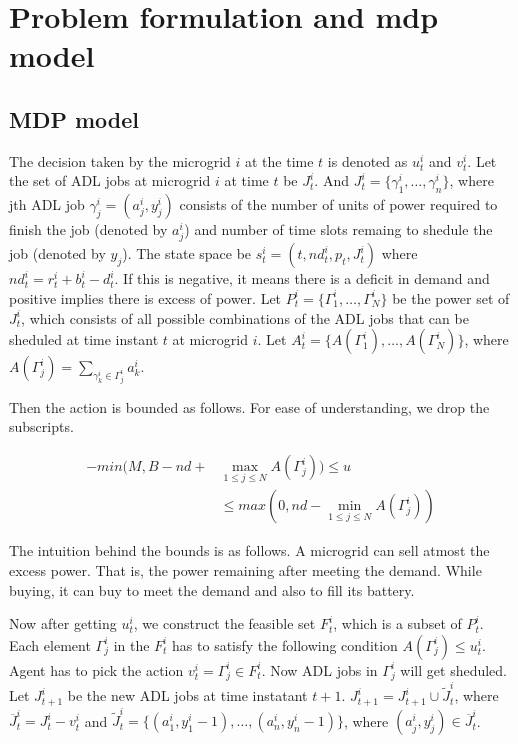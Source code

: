 \section{Problem formulation and mdp model}



\subsection{MDP model}

The decision taken by the microgrid $i$ at the time $t$ is denoted as $u_{t}^{i}$ and $v_{t}^{i}$.
Let the set of ADL jobs at microgrid $i$ at time $t$ be $J_{t}^{i}$. And  $J_{t}^{i}= \{\gamma_{1}^{i},\ldots,\gamma_{n}^{i}\}$, where jth ADL job $\gamma_{j}^{i} = (a_{j}^{i}, y_{j}^{i})$ consists of the number of units of power required to finish the job (denoted by  $a_{j}^{i}$) and number of time slots remaing to shedule the  job (denoted by  $y_{j}$).
The state space be $s_{t}^{i} = (t,nd_{t}^{i},p_{t}, J_{t}^{i})$ where $nd_{t}^{i} = r_{t}^{i} + b_{t}^{i} - d_{t}^{i}$. If this is negative, it means there is a deficit in demand and positive implies there is excess of power.
Let $P_{t}^{i} = \{\Gamma_{1}^{i},\ldots,\Gamma_{N}^{i}\}$ be the power set of $J_{t}^{i}$, which consists of all possible combinations of the ADL jobs that can be sheduled at time instant $t$ at microgrid $i$. 
Let  $A_{t}^{i} = \{A(\Gamma_{1}^{i}),\ldots,A(\Gamma_{N}^{i})\} $, where $A(\Gamma_{j}^{i}) = \sum_{\gamma_{k}^{i} \in \Gamma_{j}^{i} } a_{k}^{i}$.


Then the action is bounded as follows. For ease of understanding, we drop the subscripts.  

\begin{align}
-min(M, B - nd + &\max_{1\leq j \leq N} A(\Gamma_{j}^{i}) ) \leq u \nonumber\\ &\leq max(0, nd - \min_{1\leq j \leq N} A(\Gamma_{j}^{i}))
\end{align}

The intuition behind the bounds is as follows. A microgrid can sell atmost the excess power. That is, the power remaining after meeting the demand. While buying, it can buy to meet the demand and also to fill its battery.

Now after getting $u_{t}^{i}$, we construct the feasible set $F_{t}^{i}$, which is a subset of $P_{t}^{i}$. Each element $\Gamma_{j}^{i}$ in the $F_{t}^{i}$ has to satisfy the following condition $A(\Gamma_{j}^{i}) \leq u_{t}^{i} $.
Agent has to pick the action $v_{t}^{i} = \Gamma_{j}^{i} \in F_{t}^{i}$. Now ADL jobs in $\Gamma_{j}^{i}$ will get sheduled. Let $J_{t+1}^{i}$ be the new ADL jobs at time instatant $t+1$. $J_{t+1}^{i} = J_{t+1}^{i} \cup \widetilde J_{t}^{i}$, where $\overline J_{t}^{i} = J_{t}^{i} - v_{t}^{i}$ and $\widetilde J_{t}^{i} =  \{(a_{1}^{i}, y_{1}^{i} - 1),\ldots,(a_{n}^{i}, y_{n}^{i} - 1)\}$, where $ (a_{j}^{i}, y_{j}^{i}) \in \overline J_{t}^{i}$.

